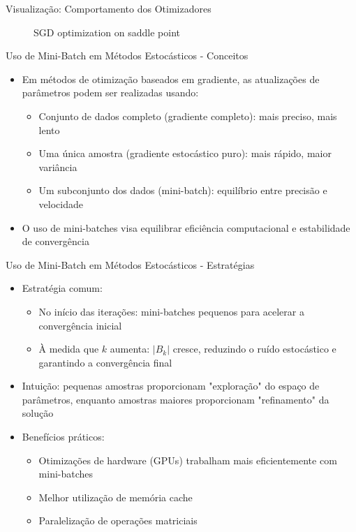 \documentclass[aspectratio=1610]{beamer}
\begin{document}
\begin{frame}{Visualização: Comportamento dos Otimizadores}
\begin{figure}
\centering
{}
\caption{SGD optimization on saddle point}
\end{figure}
\end{frame}

\begin{frame}{Uso de Mini-Batch em Métodos Estocásticos - Conceitos}
\begin{itemize}
    \item Em métodos de otimização baseados em gradiente, as atualizações de parâmetros podem ser realizadas usando:
    \begin{itemize}
        \item Conjunto de dados completo (gradiente completo): mais preciso, mais lento
        \item Uma única amostra (gradiente estocástico puro): mais rápido, maior variância
        \item Um subconjunto dos dados (mini-batch): equilíbrio entre precisão e velocidade
    \end{itemize}
    \item O uso de mini-batches visa equilibrar eficiência computacional e estabilidade de convergência
\end{itemize}
\end{frame}

\begin{frame}{Uso de Mini-Batch em Métodos Estocásticos - Estratégias}
\begin{itemize}
    \item Estratégia comum:
    \begin{itemize}
        \item No início das iterações: mini-batches pequenos para acelerar a convergência inicial
        \item À medida que $k$ aumenta: $|B_k|$ cresce, reduzindo o ruído estocástico e garantindo a convergência final
    \end{itemize}
    \item Intuição: pequenas amostras proporcionam "exploração" do espaço de parâmetros, enquanto amostras maiores proporcionam "refinamento" da solução
    \item Benefícios práticos:
    \begin{itemize}
        \item Otimizações de hardware (GPUs) trabalham mais eficientemente com mini-batches
        \item Melhor utilização de memória cache
        \item Paralelização de operações matriciais
    \end{itemize}
\end{itemize}
\end{frame}
\end{document}
